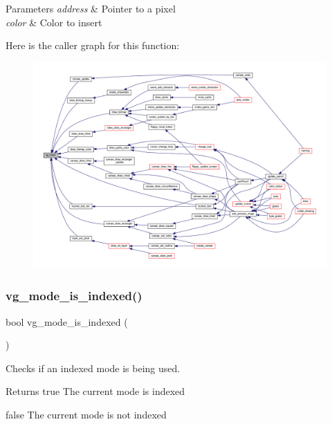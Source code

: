 \begin{DoxyParams}{Parameters}
{\em address} & Pointer to a pixel \\
\hline
{\em color} & Color to insert \\
\hline
\end{DoxyParams}
Here is the caller graph for this function\+:\nopagebreak
\begin{figure}[H]
\begin{center}
\leavevmode
\includegraphics[width=350pt]{group__video_ga9ce8b7520a298fda9e59cdeffbbd8670_icgraph}
\end{center}
\end{figure}
\mbox{\label{group__video_ga045a67e6823cba5cf0778c4bc7440b5b}} 
\subsubsection{\texorpdfstring{vg\+\_\+mode\+\_\+is\+\_\+indexed()}{vg\_mode\_is\_indexed()}}
{\footnotesize\ttfamily bool vg\+\_\+mode\+\_\+is\+\_\+indexed (\begin{DoxyParamCaption}{ }\end{DoxyParamCaption})}



Checks if an indexed mode is being used. 

\begin{DoxyReturn}{Returns}
true The current mode is indexed 

false The current mode is not indexed 
\end{DoxyReturn}
\mbox{\label{group__video_ga1ff6d214ea6b767e283a9973bd129c7e}} 
